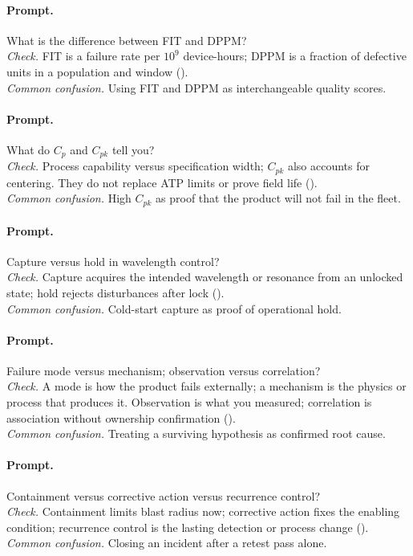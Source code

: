 \paragraph{Prompt.} What is the difference between FIT and DPPM?\\
\textit{Check.} FIT is a failure rate per $10^9$ device-hours; DPPM is a
fraction of defective units in a population and window
().\\
\textit{Common confusion.} Using FIT and DPPM as interchangeable quality scores.

\paragraph{Prompt.} What do $C_p$ and $C_{pk}$ tell you?\\
\textit{Check.} Process capability versus specification width; $C_{pk}$ also
accounts for centering. They do not replace ATP limits or prove field life
().\\
\textit{Common confusion.} High $C_{pk}$ as proof that the product will not fail
in the fleet.

\paragraph{Prompt.} Capture versus hold in wavelength control?\\
\textit{Check.} Capture acquires the intended wavelength or resonance from an
unlocked state; hold rejects disturbances after lock
().\\
\textit{Common confusion.} Cold-start capture as proof of operational hold.

\paragraph{Prompt.} Failure mode versus mechanism; observation versus
correlation?\\
\textit{Check.} A mode is how the product fails externally; a mechanism is the
physics or process that produces it. Observation is what you measured;
correlation is association without ownership confirmation
().\\
\textit{Common confusion.} Treating a surviving hypothesis as confirmed root
cause.

\paragraph{Prompt.} Containment versus corrective action versus recurrence
control?\\
\textit{Check.} Containment limits blast radius now; corrective action fixes the
enabling condition; recurrence control is the lasting detection or process
change ().\\
\textit{Common confusion.} Closing an incident after a retest pass alone.


